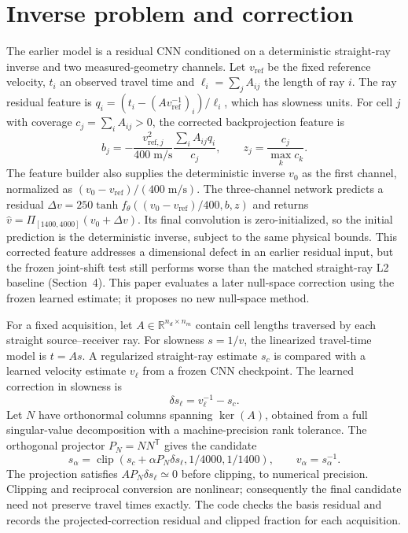 \documentclass[11pt]{article}
\begin{document}
\section{Inverse problem and correction}\label{sec:inverse-problem-and-correction}
The earlier model is a residual CNN conditioned on a deterministic straight-ray inverse and two measured-geometry channels. Let $v_{\mathrm{ref}}$ be the fixed reference velocity, $t_i$ an observed travel time and $\ell_i=\sum_j A_{ij}$ the length of ray $i$. The ray residual feature is $q_i=(t_i-(A v_{\mathrm{ref}}^{-1})_i)/\ell_i$, which has slowness units. For cell $j$ with coverage $c_j=\sum_i A_{ij}>0$, the corrected backprojection feature is
\[
  b_j=-\frac{v_{\mathrm{ref},j}^2}{400\;\mathrm{m/s}}\frac{\sum_i A_{ij}q_i}{c_j},
  \qquad z_j=\frac{c_j}{\max_k c_k}.
\]
The feature builder also supplies the deterministic inverse $v_0$ as the first channel, normalized as $(v_0-v_{\mathrm{ref}})/(400\;\mathrm{m/s})$. The three-channel network predicts a residual $\Delta v=250\tanh f_\theta((v_0-v_{\mathrm{ref}})/400,b,z)$ and returns $\hat v=\Pi_{[1400,4000]}(v_0+\Delta v)$. Its final convolution is zero-initialized, so the initial prediction is the deterministic inverse, subject to the same physical bounds. This corrected feature addresses a dimensional defect in an earlier residual input, but the frozen joint-shift test still performs worse than the matched straight-ray L2 baseline (Section~4). This paper evaluates a later null-space correction using the frozen learned estimate; it proposes no new null-space method.

For a fixed acquisition, let $A\in\mathbb{R}^{n_d\times n_m}$ contain cell lengths traversed by each straight source--receiver ray. For slowness $s=1/v$, the linearized travel-time model is $t=As$. A regularized straight-ray estimate $s_c$ is compared with a learned velocity estimate $v_\ell$ from a frozen CNN checkpoint. The learned correction in slowness is
\[
  \delta s_\ell = v_\ell^{-1}-s_c.
\]
Let $N$ have orthonormal columns spanning $\ker(A)$, obtained from a full singular-value decomposition with a machine-precision rank tolerance. The orthogonal projector $P_N=NN^\mathsf{T}$ gives the candidate
\[
  s_\alpha = \operatorname{clip}\!\left(s_c+\alpha P_N\delta s_\ell,
                 1/4000,1/1400\right), \qquad v_\alpha=s_\alpha^{-1}.
\]
The projection satisfies $A P_N\delta s_\ell\simeq 0$ before clipping, to numerical precision. Clipping and reciprocal conversion are nonlinear; consequently the final candidate need not preserve travel times exactly. The code checks the basis residual and records the projected-correction residual and clipped fraction for each acquisition.
\end{document}
